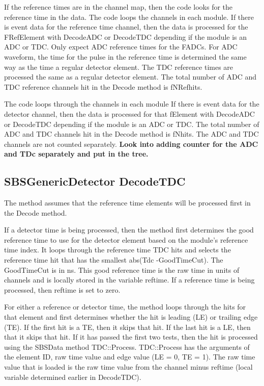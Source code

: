 \documentclass[11pt]{article}
\begin{document}
If the reference times are in the channel map, then the code looks for the reference time in the data.
The code loops the channels in each module. If there is event data for the reference time channel,
then the data is processed for the FRefElement with DecodeADC or DecodeTDC depending if the module is an ADC or TDC.
Only expect ADC reference times for the FADCs. For ADC waveform, the time for the pulse in 
the reference time is determined the same way as the time a regular detector element.
The TDC reference times are processed the same as a regular detector element.
The total number of  ADC and TDC reference channels hit in the Decode method is fNRefhits.

The code loops through the  channels in each module 
If there is event data for the detector channel,
then the data is processed for that fElement  with DecodeADC or DecodeTDC 
depending if the module is an ADC or TDC.
The total number of  ADC and TDC channels hit in the Decode method  is fNhits. The ADC and TDC channels
are not counted separately. {\bf Look into adding counter for the ADC and TDc separately and put in the tree.}

\subsection{SBSGenericDetector DecodeTDC}
The method assumes that the reference time elements will be processed first in the Decode method.

If a detector time is being processed, then the method first determines the good reference
time to use for the detector element based on the module's reference time index. 
It loops through the reference time TDC hits and selects the reference time hit that has
the smallest abs(Tdc -GoodTimeCut). The GoodTimeCut is in ns. This good reference time is the raw time
in units of channels and is locally stored in the variable reftime. If a reference time is being processed,
then reftime is set to zero.

For either a reference or detector time, the method loops through the hits for that element 
and first determines whether the hit is leading (LE)  or trailing edge (TE).
If the first hit is a TE, then it skips that hit. If the last hit is a LE, then that it skips that hit.
If it has passed the first two tests, then the hit is processed using the SBSData method TDC::Process.
TDC::Process has the arguments of the element ID, raw time value and edge value (LE = 0, TE = 1).
The raw time value that is loaded is the raw time value from the channel minus reftime (local variable determined earlier in DecodeTDC).
\end{document}
